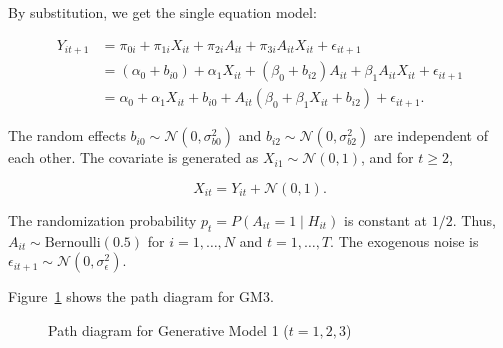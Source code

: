 \documentclass[
  12pt,
  a4paper,
]{article}
\begin{document}
By substitution, we get the single equation model:

\[
\begin{aligned}
Y_{it+1} &= \pi_{0i} + \pi_{1i} X_{it} + \pi_{2i} A_{it} + \pi_{3i} A_{it} X_{it} + \epsilon_{it+1} \\
&= (\alpha_0 + b_{i0}) + \alpha_1 X_{it} + (\beta_0 + b_{i2}) A_{it} + \beta_1 A_{it} X_{it} + \epsilon_{it+1} \\
&= \alpha_0 + \alpha_1 X_{it} + b_{i0} + A_{it} (\beta_0 + \beta_1 X_{it} + b_{i2}) + \epsilon_{it+1}.
\end{aligned}
\]

The random effects \(b_{i0} \sim \mathcal{N}(0, \sigma_{b0}^2)\) and
\(b_{i2} \sim \mathcal{N}(0, \sigma_{b2}^2)\) are independent of each
other. The covariate is generated as \(X_{i1} \sim \mathcal{N}(0, 1)\),
and for \(t \geq 2\),

\[
X_{it} = Y_{it} + \mathcal{N}(0, 1).
\]

The randomization probability \(p_t = P(A_{it} = 1 \mid H_{it})\) is
constant at \(1/2\). Thus, \(A_{it} \sim \text{Bernoulli}(0.5)\) for
\(i = 1, \ldots, N\) and \(t = 1, \ldots, T\). The exogenous noise is
\(\epsilon_{it+1} \sim \mathcal{N}(0, \sigma_\epsilon^2)\).

Figure~\ref{fig-GM1_path} shows the path diagram for GM3.

\begin{figure}[H]

\caption{\label{fig-GM1_path}Path diagram for Generative Model 1
(\(t = 1, 2, 3\))}


\end{figure}%
\end{document}

